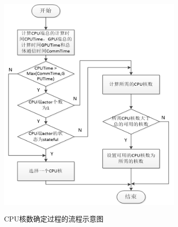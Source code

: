 \begin{figure}[htbp] 
  \centering
  \includegraphics[width=0.8\textwidth]{Img/Chap_Application/Yu/3-2.png}\\
  \caption{CPU核数确定过程的流程示意图}\label{fig:3.2}
\end{figure}

